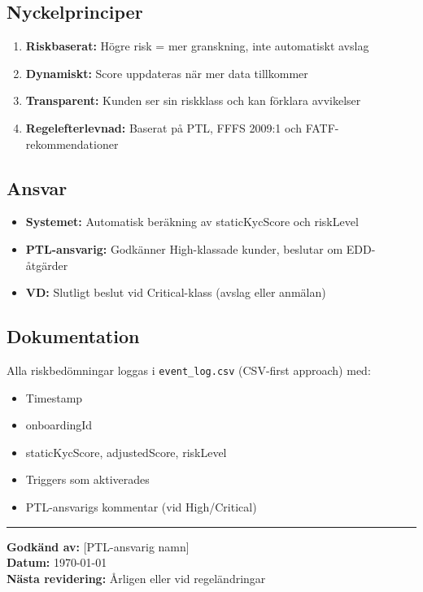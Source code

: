 \documentclass[12pt,a4paper]{article}
\begin{document}
\subsection{Nyckelprinciper}

\begin{enumerate}[noitemsep]
  \item \textbf{Riskbaserat:} Högre risk = mer granskning, inte automatiskt avslag
  \item \textbf{Dynamiskt:} Score uppdateras när mer data tillkommer
  \item \textbf{Transparent:} Kunden ser sin riskklass och kan förklara avvikelser
  \item \textbf{Regelefterlevnad:} Baserat på PTL, FFFS 2009:1 och FATF-rekommendationer
\end{enumerate}

\subsection{Ansvar}

\begin{itemize}[noitemsep]
  \item \textbf{Systemet:} Automatisk beräkning av staticKycScore och riskLevel
  \item \textbf{PTL-ansvarig:} Godkänner High-klassade kunder, beslutar om EDD-åtgärder
  \item \textbf{VD:} Slutligt beslut vid Critical-klass (avslag eller anmälan)
\end{itemize}

\subsection{Dokumentation}

Alla riskbedömningar loggas i \texttt{event\_log.csv} (CSV-first approach) med:
\begin{itemize}[noitemsep]
  \item Timestamp
  \item onboardingId
  \item staticKycScore, adjustedScore, riskLevel
  \item Triggers som aktiverades
  \item PTL-ansvarigs kommentar (vid High/Critical)
\end{itemize}

\vspace{1cm}
\hrule
\vspace{0.5cm}
\textbf{Godkänd av:} [PTL-ansvarig namn] \\
\textbf{Datum:} \today \\
\textbf{Nästa revidering:} Årligen eller vid regeländringar
\end{document}
